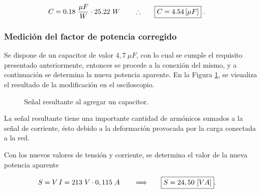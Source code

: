         \begin{align*}
          C= 0.18~\frac{\mu F}{W} \cdot 25.22~W \hspace{20pt} \therefore \hspace{20pt} \Aboxed{C=4.54 \left [ \mu F \right ]}~.
        \end{align*}


    \subsubsection{Medición del factor de potencia corregido}\label{subsubsec:Medicion del factor de potencia corregido}

          Se dispone de un capacitor de valor $4,7~\mu F$, con lo cual se cumple el requisito presentado
          anteriormente, entonces se procede a la conexión del mismo, y a continuación se determina la nueva potencia aparente. 
          En la Figura \ref{fig: Señal_Correccion}, se visualiza el resultado de la modificación en el osciloscopio.
        
        \begin{figure}[H]
          \centering
          \caption{Señal resultante al agregar un capacitor.}
          \label{fig: Señal_Correccion}
        \end{figure}

        La señal resultante tiene una importante cantidad de armónicos sumados a la señal de corriente, ésto debido
        a la deformación provocada por la carga conectada a la red.

         Con los nuevos valores de tensión y corriente, se determina el valor de la nueva potencia 
         aparente

        \begin{align*}
          S = V\,I  = 213~V \cdot 0,115\ A \hspace{20pt} \Longrightarrow \hspace{20pt} \Aboxed{S = 24,50 ~[VA]}.
        \end{align*}

